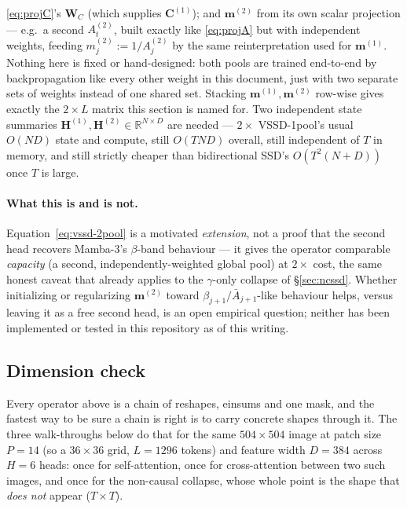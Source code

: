 \documentclass[11pt,a4paper]{article}
\begin{document}
\eqref{eq:projC}'s $\bm{W}_C$ (which supplies $\bm{C}^{(1)}$); and
$\bm{m}^{(2)}$ from its own scalar projection --- e.g.\ a second
$A^{(2)}_t$, built exactly like \eqref{eq:projA} but with independent
weights, feeding $m^{(2)}_j := 1/A^{(2)}_j$ by the same
reinterpretation used for $\bm{m}^{(1)}$. Nothing here is fixed or
hand-designed: both pools are trained end-to-end by backpropagation
like every other weight in this document, just with two separate sets
of weights instead of one shared set. Stacking $\bm{m}^{(1)},\bm{m}^{(2)}$ row-wise gives
exactly the $2\times L$ matrix this section is named for. Two
independent state summaries $\bm{H}^{(1)},\bm{H}^{(2)}\in
\mathbb{R}^{N\times D}$ are needed --- $2\times$ VSSD-1pool's usual
$O(ND)$ state and compute, still $O(TND)$ overall, still independent
of $T$ in memory, and still strictly cheaper than bidirectional SSD's
$O(T^2(N+D))$ once $T$ is large.

\paragraph{What this is and is not.} Equation~\eqref{eq:vssd-2pool}
is a motivated \emph{extension}, not a proof that the second head
recovers Mamba-3's $\beta$-band behaviour --- it gives the operator
comparable \emph{capacity} (a second, independently-weighted global
pool) at $2\times$ cost, the same honest caveat that already applies
to the $\gamma$-only collapse of \S\ref{sec:ncssd}. Whether
initializing or regularizing $\bm{m}^{(2)}$ toward
$\beta_{j+1}/\bar A_{j+1}$-like behaviour helps, versus leaving it as
a free second head, is an open empirical question; neither has been
implemented or tested in this repository as of this writing.

\subsection{Dimension check}
\label{sec:dimcheck}

Every operator above is a chain of reshapes, einsums and one mask, and the fastest way
to be sure a chain is right is to carry concrete shapes through it. The three
walk-throughs below do that for the same $504\times504$ image at patch size $P=14$
(so a $36\times36$ grid, $L=1296$ tokens) and feature width $D=384$ across $H=6$
heads: once for self-attention, once for cross-attention between two such images, and
once for the non-causal collapse, whose whole point is the shape that \emph{does not}
appear ($T\times T$).
\end{document}
